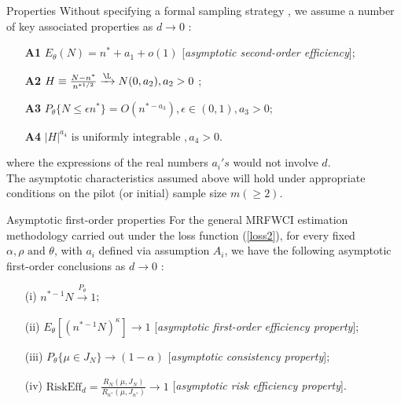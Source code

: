 \documentclass [xcolor=svgnames, t] {beamer}
\begin{document}
\begin{frame}{Properties}
  \vspace{5mm}
 Without specifying a formal sampling strategy , we assume a number of key associated properties as $d \xrightarrow{} 0$ :
   
    \begin{itemize}
        \item[\textbf{A1}] $ E_{\theta}(N)=n^* +a_1 +o(1)$ [\textit{asymptotic second-order efficiency}];
         \item[\textbf{A2}] $H \equiv \frac{N-n^*}{n^{*1/2}} \xrightarrow{\L} N(0,a_2), a_2>0$ ;
          \item[\textbf{A3}] $P_{\theta}\{ N \le \epsilon n^*\}=O(n^{*-a_3}),\epsilon \in (0,1), a_3>0$;
           \item[\textbf{A4}] $|H|^{a_4} \text{ is uniformly integrable },a_4 >0$.
    \end{itemize}
    
    where the expressions of the real numbers $a_i's$ would not involve $d$.\\
    \vspace{0.2cm}
    The asymptotic characteristics assumed above will hold under appropriate conditions on the pilot (or initial) sample size $m( \geq 2)$.
\end{frame}
\begin{frame}{Asymptotic first-order properties}
  \vspace{5mm}
For the general MRFWCI estimation methodology carried out under the loss function (\ref{loss2}), for every fixed $\alpha, \rho \text{ and }
 \theta$, with $a_i$ defined via assumption $A_i$, we have the following asymptotic first-order conclusions as $d \xrightarrow{} 0$ :

\begin{itemize}
\item[(i)] $n^{*-1}N \xrightarrow[]{P_{\theta}}1$;
\item[(ii)] $E_{\theta}[(n^{*-1}N)^{\kappa}] \xrightarrow[]{} 1$ [\textit{asymptotic first-order efficiency property}];
\item[(iii)] $P_{\theta} \{ \mu \in J_N\} \xrightarrow[]{} (1-\alpha)$ [\textit{asymptotic consistency property}];
\item[(iv)] $\text{RiskEff}_d =\frac{R_N(\mu,J_N)}{R_{n^*}(\mu,J_{n^*})} \xrightarrow[]{} 1$ [\textit{asymptotic risk efficiency property}].
\end{itemize}
 
\end{frame}
\end{document}
